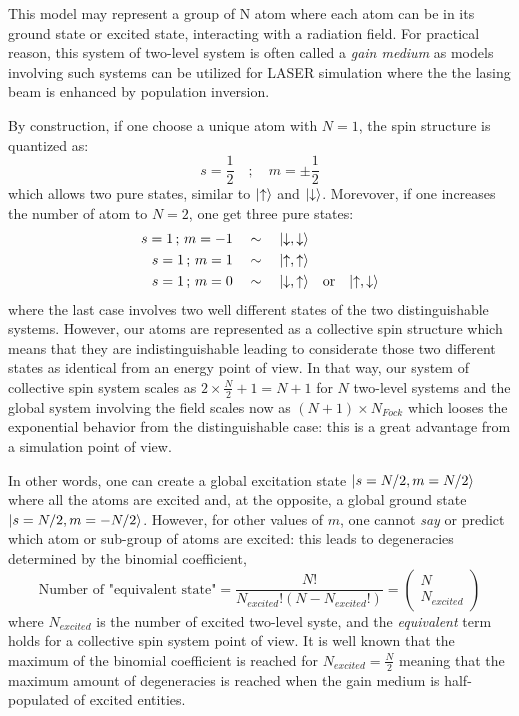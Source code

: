 \documentclass[10pt]{report}
\DeclarePairedDelimiter\ket{\lvert}{\rangle}
\begin{document}
This model may represent a group of N atom where each atom can be in its ground state or excited state, interacting with a radiation field. For practical reason, this system of two-level system is often called a \textit{gain medium} as models involving such systems can be utilized for LASER simulation where the the lasing beam is enhanced by population inversion.

By construction, if one choose a unique atom with $N=1$, the spin structure is quantized as:
\begin{equation}
s = \frac{1}{2} \quad; \quad m = \pm \frac{1}{2}
\end{equation}
which allows two pure states, similar to $\ket{\uparrow}$ and $\ket{\downarrow}$. Morevover, if one increases the number of atom to $N=2$, one get three pure states:
\begin{align*}
s = 1 \,;\, m = -1 \quad &\sim \quad \ket{\downarrow, \downarrow}\\
s = 1 \,;\, m = 1 \quad &\sim \quad \ket{\uparrow, \uparrow}\\
s = 1 \,;\, m = 0 \quad &\sim \quad \ket{\downarrow, \uparrow} \quad \textrm{or} \quad \ket{\uparrow, \downarrow}\\
\end{align*}
where the last case involves two well different states of the two distinguishable systems. However, our atoms are represented as a collective spin structure which means that they are indistinguishable leading to considerate those two different states as identical from an energy point of view. In that way, our system of collective spin system scales as $2 \times \frac{N}{2} + 1 = N + 1$ for $N$ two-level systems and the global system involving the field scales now as $(N+1) \times N_{Fock}$ which looses the exponential behavior from the distinguishable case: this is a great advantage from a simulation point of view.

In other words, one can create a global excitation state $\ket{s = N/2, m = N/2}$ where all the atoms are excited and, at the opposite, a global ground state $\ket{s = N/2, m = -N/2}$. However, for other values of $m$, one cannot \textit{say} or predict which atom or sub-group of atoms are excited: this leads to degeneracies determined by the binomial coefficient,
\begin{equation}
\textrm{Number of "equivalent state"} = \frac{N!}{N_{excited}!(N-N_{excited}!)} = \begin{pmatrix}
N\\
N_{excited}
\end{pmatrix} 	
\end{equation}
where $N_{excited}$ is the number of excited two-level syste, and the \textit{equivalent} term holds for a collective spin system point of view. It is well known that the maximum of the binomial coefficient is reached for $N_{excited} = \frac{N}{2}$ meaning that the maximum amount of degeneracies is reached when the gain medium is half-populated of excited entities.
\end{document}
